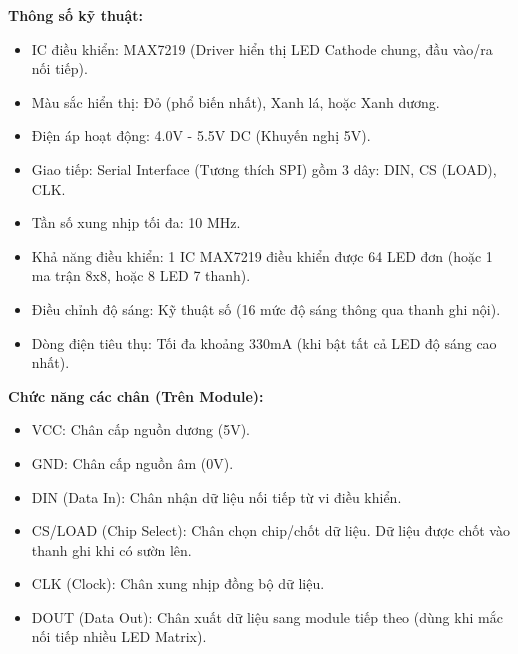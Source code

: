 \noindent\textbf{Thông số kỹ thuật:}
\begin{itemize}
    \item IC điều khiển: MAX7219 (Driver hiển thị LED Cathode chung, đầu vào/ra nối tiếp).
    \item Màu sắc hiển thị: Đỏ (phổ biến nhất), Xanh lá, hoặc Xanh dương.
    \item Điện áp hoạt động: 4.0V - 5.5V DC (Khuyến nghị 5V).
    \item Giao tiếp: Serial Interface (Tương thích SPI) gồm 3 dây: DIN, CS (LOAD), CLK.
    \item Tần số xung nhịp tối đa: 10 MHz.
    \item Khả năng điều khiển: 1 IC MAX7219 điều khiển được 64 LED đơn (hoặc 1 ma trận 8x8, hoặc 8 LED 7 thanh).
    \item Điều chỉnh độ sáng: Kỹ thuật số (16 mức độ sáng thông qua thanh ghi nội).
    \item Dòng điện tiêu thụ: Tối đa khoảng 330mA (khi bật tất cả LED độ sáng cao nhất).
\end{itemize}
\textbf{Chức năng các chân (Trên Module):}
\begin{itemize}
    \item VCC: Chân cấp nguồn dương (5V).
    \item GND: Chân cấp nguồn âm (0V).
    \item DIN (Data In): Chân nhận dữ liệu nối tiếp từ vi điều khiển.
    \item CS/LOAD (Chip Select): Chân chọn chip/chốt dữ liệu. Dữ liệu được chốt vào thanh ghi khi có sườn lên.
    \item CLK (Clock): Chân xung nhịp đồng bộ dữ liệu.
    \item DOUT (Data Out): Chân xuất dữ liệu sang module tiếp theo (dùng khi mắc nối tiếp nhiều LED Matrix).
\end{itemize}
